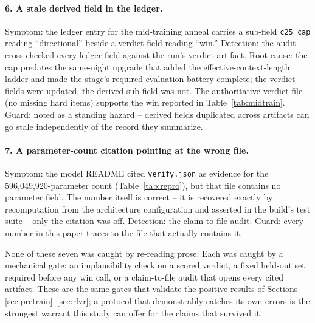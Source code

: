 \paragraph{6. A stale derived field in the ledger.}
Symptom: the ledger entry for the mid-training anneal carries a sub-field \texttt{c25\_cap} reading ``directional'' beside a verdict field reading ``win.'' Detection: the audit cross-checked every ledger field against the run's verdict artifact. Root cause: the cap predates the same-night upgrade that added the effective-context-length ladder and made the stage's required evaluation battery complete; the verdict fields were updated, the derived sub-field was not. The authoritative verdict file (no missing hard items) supports the win reported in Table~\ref{tab:midtrain}. Guard: noted as a standing hazard -- derived fields duplicated across artifacts can go stale independently of the record they summarize.

\paragraph{7. A parameter-count citation pointing at the wrong file.}
Symptom: the model README cited \texttt{verify.json} as evidence for the 596{,}049{,}920-parameter count (Table~\ref{tab:repro}), but that file contains no parameter field. The number itself is correct -- it is recovered exactly by recomputation from the architecture configuration and asserted in the build's test suite -- only the citation was off. Detection: the claim-to-file audit. Guard: every number in this paper traces to the file that actually contains it.

None of these seven was caught by re-reading prose. Each was caught by a mechanical gate: an implausibility check on a scored verdict, a fixed held-out set required before any win call, or a claim-to-file audit that opens every cited artifact. These are the same gates that validate the positive results of Sections \ref{sec:pretrain}--\ref{sec:rlvr}; a protocol that demonstrably catches its own errors is the strongest warrant this study can offer for the claims that survived it.
